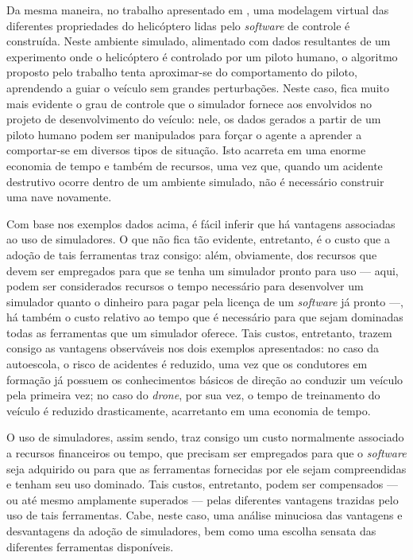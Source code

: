 \documentclass[cic,tc]{iiufrgs}
\begin{document}
Da mesma maneira, no trabalho apresentado em \cite{Ng2003}, uma modelagem
virtual das diferentes propriedades do helicóptero lidas pelo \textit{software}
de controle é construída. Neste ambiente simulado, alimentado com dados
resultantes de um experimento onde o helicóptero é controlado por um piloto
humano, o algoritmo proposto pelo trabalho tenta aproximar-se do comportamento
do piloto, aprendendo a guiar o veículo sem grandes perturbações. Neste caso, fica muito
mais evidente o grau de controle que o simulador fornece aos envolvidos no
projeto de desenvolvimento do veículo: nele, os dados gerados a partir de um
piloto humano podem ser manipulados para forçar o agente a aprender a
comportar-se em diversos tipos de situação. Isto acarreta em uma enorme economia
de tempo e também de recursos, uma vez que, quando um acidente destrutivo ocorre
dentro de um ambiente simulado, não é necessário construir uma nave novamente.



Com base nos exemplos dados acima, é fácil inferir que há vantagens associadas
ao uso de simuladores. O que não fica tão evidente, entretanto, é o custo que a
adoção de tais ferramentas traz consigo: além, obviamente, dos recursos que
devem ser empregados para que se tenha um simulador pronto para uso --- aqui,
podem ser considerados recursos o tempo necessário para desenvolver um simulador
quanto o dinheiro para pagar pela licença de um \textit{software} já pronto ---,
há também o custo relativo ao tempo que é necessário para que sejam dominadas
todas as ferramentas que um simulador oferece. Tais custos, entretanto, trazem
consigo as vantagens observáveis nos dois exemplos apresentados: no caso da
autoescola, o risco de acidentes é reduzido, uma vez que os condutores em
formação já possuem os conhecimentos básicos de direção ao conduzir um veículo
pela primeira vez; no caso do \textit{drone}, por sua vez, o tempo de
treinamento do veículo é reduzido drasticamente, acarretanto em uma economia de
tempo.


O uso de simuladores, assim sendo, traz consigo um custo normalmente associado
a recursos financeiros ou tempo, que precisam ser empregados para que o
\textit{software} seja adquirido ou para que as ferramentas fornecidas por ele
sejam compreendidas e tenham seu uso dominado. Tais custos, entretanto, podem
ser compensados --- ou até mesmo amplamente superados --- pelas diferentes
vantagens trazidas pelo uso de tais ferramentas. Cabe, neste caso, uma análise
minuciosa das vantagens e desvantagens da adoção de simuladores, bem como uma
escolha sensata das diferentes ferramentas disponíveis.
\end{document}

